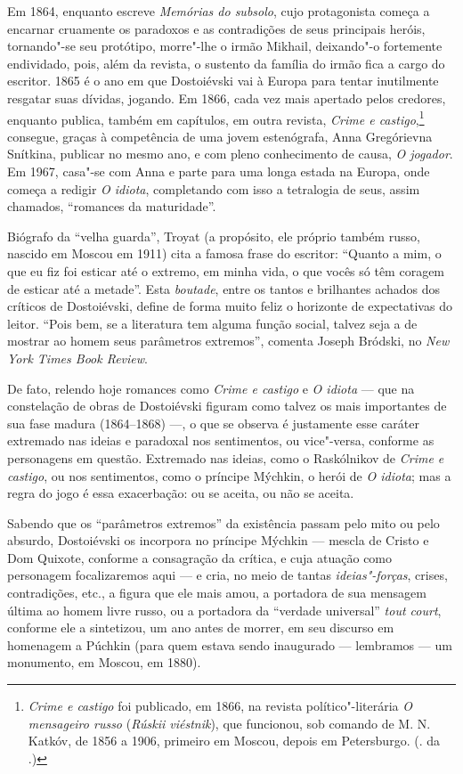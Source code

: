Em 1864, enquanto escreve \emph{Memórias do subsolo}, cujo
protagonista começa a encarnar cruamente os paradoxos e as
contradições de seus principais heróis, tornando"-se seu
protótipo, morre"-lhe o irmão Mikhail, deixando"-o fortemente
endividado, pois, além da revista, o sustento da família do
irmão fica a cargo do escritor. 1865 é o ano em que Dostoiévski
vai à Europa para tentar inutilmente resgatar suas dívidas,
jogando. Em 1866, cada vez mais apertado pelos credores, enquanto
publica, também em capítulos, em outra revista, \emph{Crime e
castigo},\footnote{\emph{Crime e castigo} foi publicado, em 1866,
na revista político"-literária \emph{O mensageiro russo}
(\emph{Rúskii viéstnik}), que funcionou, sob comando de M. N.
Katkóv, de 1856 a 1906, primeiro em Moscou, depois em Petersburgo.
(. da .)} consegue, graças à competência de uma jovem
estenógrafa, Anna Gregórievna Snítkina, publicar no mesmo ano,
e com pleno conhecimento de causa, \emph{O jogador}. Em 1967,
casa"-se com Anna e parte para uma longa estada na Europa, onde
começa a redigir \emph{O idiota}, completando com isso a
tetralogia de seus, assim chamados, ``romances da maturidade''.

Biógrafo da ``velha guarda'', Troyat (a propósito, ele próprio
também russo, nascido em Moscou em 1911) cita a famosa frase
do escritor: ``Quanto a mim, o que eu fiz foi esticar até o
extremo, em minha vida, o que vocês só têm coragem de esticar até
a metade''. Esta \emph{boutade}, entre os tantos e brilhantes achados
dos críticos de Dostoiévski, define de forma muito feliz o
horizonte de expectativas do leitor. ``Pois bem, se a
literatura tem alguma função social, talvez seja a de mostrar
ao homem seus parâmetros extremos'', comenta Joseph Bródski,
no \emph{New York Times Book Review}.

De fato, relendo hoje romances como \emph{Crime e castigo}
e \emph{O idiota} --- que na constelação de
obras de Dostoiévski figuram como talvez os mais importantes
de sua fase madura (1864--1868) ---, o que se observa é
justamente esse caráter extremado nas ideias e paradoxal
nos sentimentos, ou vice"-versa, conforme as personagens em
questão. Extremado nas ideias, como o Raskólnikov de
\emph{Crime e castigo}, ou nos sentimentos, como o príncipe
Mýchkin, o herói de \emph{O idiota}; mas a regra do jogo é essa
exacerbação: ou se aceita, ou não se aceita. 

Sabendo que os ``parâmetros
extremos'' da existência passam pelo mito ou pelo absurdo, Dostoiévski
os incorpora no príncipe Mýchkin --- mescla de Cristo e Dom Quixote,
conforme a consagração da crítica, e cuja atuação como personagem
focalizaremos aqui --- e cria, no meio de tantas \emph{ideias"-forças},
crises, contradições, etc., a figura que ele mais amou,
a portadora de sua mensagem última ao homem livre russo, ou
a portadora da ``verdade universal'' \emph{tout court},
conforme ele a sintetizou, um ano antes de morrer, em seu
discurso em homenagem a Púchkin (para quem estava sendo
inaugurado --- lembramos --- um monumento, em Moscou, em 1880).


